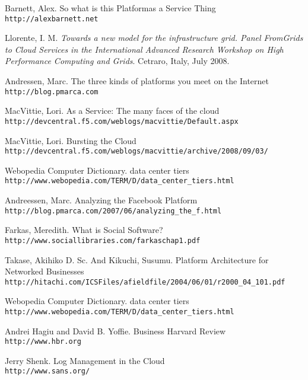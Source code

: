 \begin{thebibliography}{99}
Barnett, Alex. So what is this Platformas a Service Thing
\\\texttt{http://alexbarnett.net}

Llorente, I. M. 
\textit{Towards a new model for the infrastructure grid. Panel FromGrids to Cloud Services in the International Advanced Research Workshop on High Performance Computing and Grids}. Cetraro, Italy, July 2008.
 
Andressen, Marc. The three kinds of platforms you meet on the Internet
\\\texttt{http://blog.pmarca.com}

MacVittie, Lori. As a Service: The many faces of the cloud
\\\texttt{http://devcentral.f5.com/weblogs/macvittie/Default.aspx}

MacVittie, Lori. Bursting the Cloud
\\\texttt{http://devcentral.f5.com/weblogs/macvittie/archive/2008/09/03/}

Webopedia Computer Dictionary. data center tiers 
\\\texttt{http://www.webopedia.com/TERM/D/data\_center\_tiers.html}

Andreessen, Marc. Analyzing the Facebook Platform
\\\texttt{http://blog.pmarca.com/2007/06/analyzing\_the\_f.html}

Farkas, Meredith. What is Social Software?
\\\texttt{http://www.sociallibraries.com/farkaschap1.pdf}

Takase, Akihiko D. Sc. And Kikuchi, Susumu. Platform Architecture for Networked Businesses
\\\texttt{http://hitachi.com/ICSFiles/afieldfile/2004/06/01/r2000\_04\_101.pdf} 
 
Webopedia Computer Dictionary. data center tiers
\\\texttt{http://www.webopedia.com/TERM/D/data\_center\_tiers.html}

Andrei Hagiu and David B. Yoffie. Business Harvard Review 
\\\texttt{http://www.hbr.org}

Jerry Shenk. Log Management in the Cloud
\\\texttt{http://www.sans.org/}
\end{thebibliography}